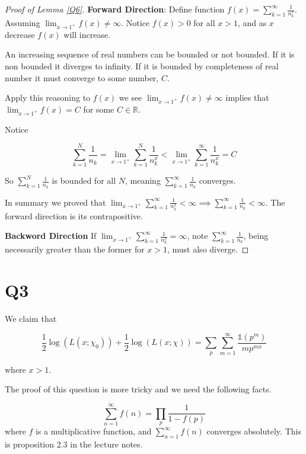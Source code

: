 \documentclass{article}
\theoremstyle{definition}
\theoremstyle{definition}
\theoremstyle{remark}
\newcommand{\bb}[1]{\mathbb{#1}} %
\begin{document}
\begin{proof}[Proof of Lemma \ref{Q6}]
	\textbf{Forward Direction}:
	Define function $f(x) = \sum_{k=1}^{\infty} \frac{1}{n_k^x} $.
	Assuming $ \lim_{x \rightarrow 1^+} f(x) \neq \infty$. 
	Notice $f(x) > 0$ for all $x>1$, and as $x$ decrease $f(x)$ will increase.

	An increasing sequence of real numbers can be bounded or not bounded. 
	If it is non bounded it diverges to infinity.
	If it is bounded by completeness of real number it must converge to some number, $C$. 

	Apply this reasoning to $f(x)$ we see $ \lim_{x \rightarrow 1^+} f(x) \neq \infty$ implies that $ \lim_{x \rightarrow 1^+} f(x) = C$ for some $C \in \bb{R}$. 

	Notice

	$$
	\sum_{k=1}^{N} \frac{1}{n_k} = \lim_{x \rightarrow  1^+} \sum_{k=1}^N \frac{1}{n_k^x} < \lim_{x \rightarrow 1^+} \sum_{k=1}^{\infty}\frac{1}{n_k^x} = C
	$$

	So $\sum_{k=1}^{N} \frac{1}{n_k}$ is bounded for all $N$, meaning $\sum_{k=1}^{\infty}\frac{1}{n_k}$ converges.

	In summary we proved that 
	$
		 \lim_{x \rightarrow 1^+} \sum_{k=1}^{\infty} \frac{1}{n_k^x} < \infty \implies \sum_{k=1}^{\infty} \frac{1}{n_k} < \infty 
	$.
	The forward direction is its contrapositive.

	\textbf{Backword Direction} 
	If
	$
		\lim_{x \rightarrow 1^+} \sum_{k=1}^{\infty} \frac{1}{n_k^x} = \infty
	$, note
	$\sum_{k=1}^{\infty} \frac{1}{n_k}$, being necessarily greater than the former for $x > 1$, must also diverge.

\end{proof}

\section*{Q3}

We claim that 

\begin{equation}
\frac{1}{2} \log(L(x; \chi_0)) + \frac{1}{2} \log(L(x; \chi)) = \sum_p \sum _{m=1}^{\infty} \frac{\mathbb{1}(p^m)}{m p^{mx}} 
\end{equation}

where $x>1$.

The proof of this question is more tricky and we need the following facts.

\begin{equation}\label{sum_to_product}
	\sum_{n=1}^{\infty} f(n) = \prod_p \frac{1}{1-f(p)}
\end{equation}
where $f$ is a multiplicative function, and $\sum_{n=1}^{\infty} f(n)$ converges absolutely. This is proposition 2.3 in the lecture notes.
\end{document}
